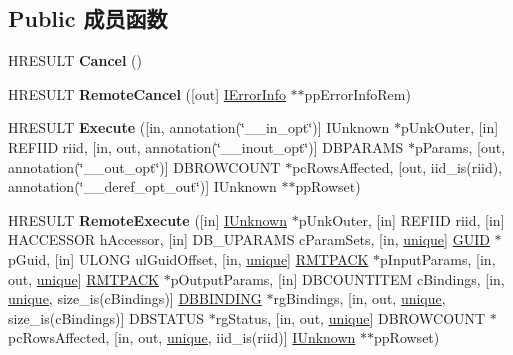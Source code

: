 \subsection*{Public 成员函数}
\begin{DoxyCompactItemize}
\item 
\mbox{\label{interface_i_command_abedabe4f6d8eb4de69ad76ef0e56d4a5}} 
H\+R\+E\+S\+U\+LT {\bfseries Cancel} ()
\item 
\mbox{\label{interface_i_command_ae7a7d5989bd3c69d121ac037ed2270f3}} 
H\+R\+E\+S\+U\+LT {\bfseries Remote\+Cancel} (\mbox{[}out\mbox{]} \hyperlink{interface_i_error_info}{I\+Error\+Info} $\ast$$\ast$pp\+Error\+Info\+Rem)
\item 
\mbox{\label{interface_i_command_af6cde25b147fc8ee8a3f3745dee2d3b3}} 
H\+R\+E\+S\+U\+LT {\bfseries Execute} (\mbox{[}in, annotation(\char`\"{}\+\_\+\+\_\+in\+\_\+opt\char`\"{})\mbox{]} I\+Unknown $\ast$p\+Unk\+Outer, \mbox{[}in\mbox{]} R\+E\+F\+I\+ID riid, \mbox{[}in, out, annotation(\char`\"{}\+\_\+\+\_\+inout\+\_\+opt\char`\"{})\mbox{]} D\+B\+P\+A\+R\+A\+MS $\ast$p\+Params, \mbox{[}out, annotation(\char`\"{}\+\_\+\+\_\+out\+\_\+opt\char`\"{})\mbox{]} D\+B\+R\+O\+W\+C\+O\+U\+NT $\ast$pc\+Rows\+Affected, \mbox{[}out, iid\+\_\+is(riid), annotation(\char`\"{}\+\_\+\+\_\+deref\+\_\+opt\+\_\+out\char`\"{})\mbox{]} I\+Unknown $\ast$$\ast$pp\+Rowset)
\item 
\mbox{\label{interface_i_command_a226e536f33274879e824b7767965e48e}} 
H\+R\+E\+S\+U\+LT {\bfseries Remote\+Execute} (\mbox{[}in\mbox{]} \hyperlink{interface_i_unknown}{I\+Unknown} $\ast$p\+Unk\+Outer, \mbox{[}in\mbox{]} R\+E\+F\+I\+ID riid, \mbox{[}in\mbox{]} H\+A\+C\+C\+E\+S\+S\+OR h\+Accessor, \mbox{[}in\mbox{]} D\+B\+\_\+\+U\+P\+A\+R\+A\+MS c\+Param\+Sets, \mbox{[}in, \hyperlink{interfaceunique}{unique}\mbox{]} \hyperlink{interface_g_u_i_d}{G\+U\+ID} $\ast$p\+Guid, \mbox{[}in\mbox{]} U\+L\+O\+NG ul\+Guid\+Offset, \mbox{[}in, \hyperlink{interfaceunique}{unique}\mbox{]} \hyperlink{structtag_r_m_t_p_a_c_k}{R\+M\+T\+P\+A\+CK} $\ast$p\+Input\+Params, \mbox{[}in, out, \hyperlink{interfaceunique}{unique}\mbox{]} \hyperlink{structtag_r_m_t_p_a_c_k}{R\+M\+T\+P\+A\+CK} $\ast$p\+Output\+Params, \mbox{[}in\mbox{]} D\+B\+C\+O\+U\+N\+T\+I\+T\+EM c\+Bindings, \mbox{[}in, \hyperlink{interfaceunique}{unique}, size\+\_\+is(c\+Bindings)\mbox{]} \hyperlink{structtag_d_b_b_i_n_d_i_n_g}{D\+B\+B\+I\+N\+D\+I\+NG} $\ast$rg\+Bindings, \mbox{[}in, out, \hyperlink{interfaceunique}{unique}, size\+\_\+is(c\+Bindings)\mbox{]} D\+B\+S\+T\+A\+T\+US $\ast$rg\+Status, \mbox{[}in, out, \hyperlink{interfaceunique}{unique}\mbox{]} D\+B\+R\+O\+W\+C\+O\+U\+NT $\ast$pc\+Rows\+Affected, \mbox{[}in, out, \hyperlink{interfaceunique}{unique}, iid\+\_\+is(riid)\mbox{]} \hyperlink{interface_i_unknown}{I\+Unknown} $\ast$$\ast$pp\+Rowset)
$$
\end{DoxyCompactItemize}
